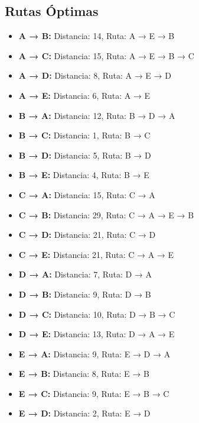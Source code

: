 \documentclass[12pt]{article}
\begin{document}
\clearpage
\subsection{Rutas Óptimas}
\begin{itemize}
\item \textbf{A → B:} Distancia: 14, Ruta: A → E → B
\item \textbf{A → C:} Distancia: 15, Ruta: A → E → B → C
\item \textbf{A → D:} Distancia: 8, Ruta: A → E → D
\item \textbf{A → E:} Distancia: 6, Ruta: A → E
\item \textbf{B → A:} Distancia: 12, Ruta: B → D → A
\item \textbf{B → C:} Distancia: 1, Ruta: B → C
\item \textbf{B → D:} Distancia: 5, Ruta: B → D
\item \textbf{B → E:} Distancia: 4, Ruta: B → E
\item \textbf{C → A:} Distancia: 15, Ruta: C → A
\item \textbf{C → B:} Distancia: 29, Ruta: C → A → E → B
\item \textbf{C → D:} Distancia: 21, Ruta: C → D
\item \textbf{C → E:} Distancia: 21, Ruta: C → A → E
\item \textbf{D → A:} Distancia: 7, Ruta: D → A
\item \textbf{D → B:} Distancia: 9, Ruta: D → B
\item \textbf{D → C:} Distancia: 10, Ruta: D → B → C
\item \textbf{D → E:} Distancia: 13, Ruta: D → A → E
\item \textbf{E → A:} Distancia: 9, Ruta: E → D → A
\item \textbf{E → B:} Distancia: 8, Ruta: E → B
\item \textbf{E → C:} Distancia: 9, Ruta: E → B → C
\item \textbf{E → D:} Distancia: 2, Ruta: E → D
\end{itemize}
\end{document}
